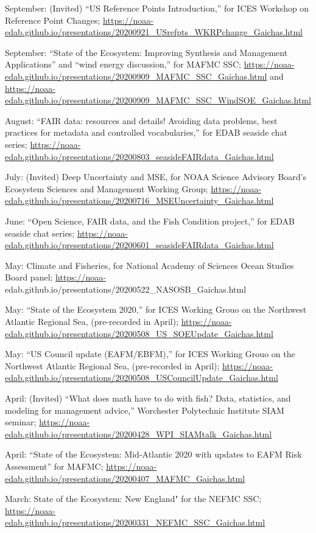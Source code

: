 \documentclass[11pt, a4paper]{awesome-cv}
\begin{document}
September: (Invited) ``US Reference Points Introduction,'' for ICES
Workshop on Reference Point Changes;
\url{https://noaa-edab.github.io/presentations/20200921_USrefpts_WKRPchange_Gaichas.html}

September: ``State of the Ecosystem: Improving Synthesis and Management
Applications'' and ``wind energy discussion,'' for MAFMC SSC;
\url{https://noaa-edab.github.io/presentations/20200909_MAFMC_SSC_Gaichas.html}
and
\url{https://noaa-edab.github.io/presentations/20200909_MAFMC_SSC_WindSOE_Gaichas.html}

August: ``FAIR data: resources and details! Avoiding data problems, best
practices for metadata and controlled vocabularies,'' for EDAB seaside
chat series;
\url{https://noaa-edab.github.io/presentations/20200803_seasideFAIRdata_Gaichas.html}

July: (Invited) Deep Uncertainty and MSE, for NOAA Science Advisory
Board's Ecosystem Sciences and Management Working Group;
\url{https://noaa-edab.github.io/presentations/20200716_MSEUncertainty_Gaichas.html}

June: ``Open Science, FAIR data, and the Fish Condition project,'' for
EDAB seaside chat series;
\url{https://noaa-edab.github.io/presentations/20200601_seasideFAIRdata_Gaichas.html}

May: Climate and Fisheries, for National Academy of Sciences Ocean
Studies Board panel; \url{https://noaa-}
edab.github.io/presentations/20200522\_NASOSB\_Gaichas.html

May: ``State of the Ecosystem 2020,'' for ICES Working Grouo on the
Northwest Atlantic Regional Sea, (pre-recorded in April);
\url{https://noaa-edab.github.io/presentations/20200508_US_SOEUpdate_Gaichas.html}

May: ``US Council update (EAFM/EBFM),'' for ICES Working Grouo on the
Northwest Atlantic Regional Sea, (pre-recorded in April);
\url{https://noaa-edab.github.io/presentations/20200508_USCouncilUpdate_Gaichas.html}

April: (Invited) ``What does math have to do with fish? Data,
statistics, and modeling for management advice,'' Worchester Polytechnic
Institute SIAM seminar;
\url{https://noaa-edab.github.io/presentations/20200428_WPI_SIAMtalk_Gaichas.html}

April: ``State of the Ecosystem: Mid-Atlantic 2020 with updates to EAFM
Risk Assessment'' for MAFMC;
\url{https://noaa-edab.github.io/presentations/20200407_MAFMC_Gaichas.html}

March: State of the Ecosystem: New England" for the NEFMC SSC;
\url{https://noaa-edab.github.io/presentations/20200331_NEFMC_SSC_Gaichas.html}
\end{document}
